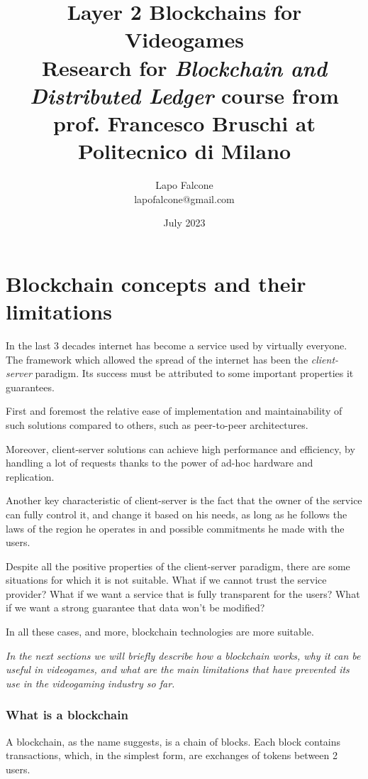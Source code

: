 \documentclass[12pt]{article}
\title{\Huge \textbf{Layer 2 Blockchains for Videogames}\\\normalsize Research for \emph{Blockchain and Distributed Ledger} course from prof. Francesco Bruschi at Politecnico di Milano}
\author{\Large Lapo Falcone\\\normalsize lapofalcone@gmail.com}
\date{July 2023}
\begin{document}
\maketitle
\newpage
\null
\newpage
\tableofcontents

\newpage

\part{Blockchain concepts and their limitations} \label{part:bcatl}
In the last 3 decades internet has become a service used by virtually everyone. The framework which allowed the spread of the internet has been the \textit{client-server} paradigm.
Its success must be attributed to some important properties it guarantees. 

First and foremost the relative ease of implementation and maintainability of such solutions compared to others, such as peer-to-peer architectures.

Moreover, client-server solutions can achieve high performance and efficiency, by handling a lot of requests thanks to the power of ad-hoc hardware and replication. 

Another key characteristic of client-server is the fact that the owner of the service can fully control it, and change it based on his needs, as long as he follows the laws of the region he operates in and possible commitments he made with the users.

Despite all the positive properties of the client-server paradigm, there are some situations for which it is not suitable. 
What if we cannot trust the service provider? What if we want a service that is fully transparent for the users? What if we want a strong guarantee that data won't be modified?

In all these cases, and more, blockchain technologies are more suitable.

\emph{In the next sections we will briefly describe how a blockchain works, why it can be useful in videogames, and what are the main limitations that have prevented its use in the videogaming industry so far.}

\section {What is a blockchain} \label{section:wiab}
A blockchain, as the name suggests, is a chain of blocks. Each block contains transactions, which, in the simplest form, are exchanges of tokens between 2 users.
\end{document}

